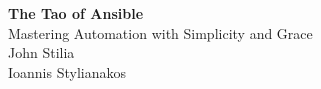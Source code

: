 \cleardoublepage  %
\thispagestyle{empty}  %

\begin{center}
\vspace*{2in}  %

{\Huge\bfseries The Tao of Ansible}\\[0.5cm]

{\large Mastering Automation with Simplicity and Grace}\\[6cm]  %

{\large John Stilia}\\[0.5cm]
{\small Ioannis Stylianakos}\\[0.1cm]

\vfill  %
\end{center}

\clearpage 